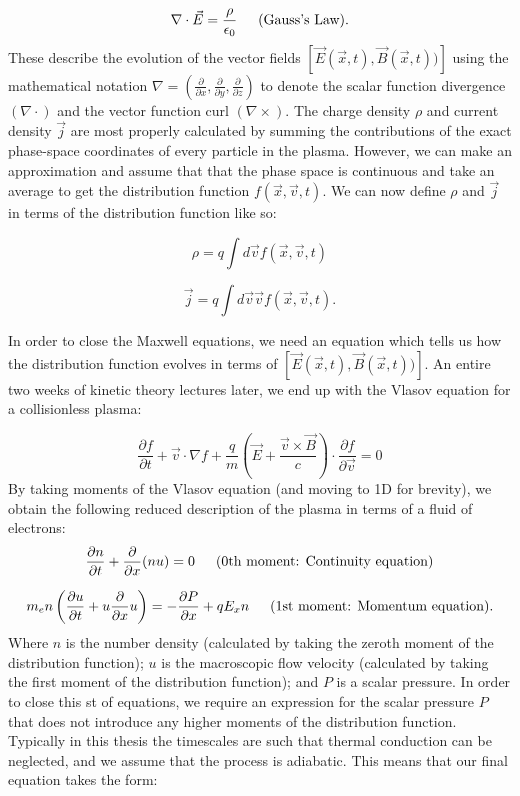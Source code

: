 \begin{equation}
\nabla \cdot \vec{E}=\frac{\rho}{\epsilon_{0}} \text{\,\,\,\,\,\,\,\,\,(Gauss's Law)}.
\end{equation} These describe the evolution of the vector fields $[\vec{E}(\vec{x},t),\vec{B}(\vec{x},t))]$ using the mathematical notation $\nabla = \left(\frac{\partial}{\partial x},\frac{\partial}{\partial y},\frac{\partial}{\partial z} \right)$ to denote the scalar function divergence $(\nabla \cdot)$ and the vector function curl $(\nabla \times)$. The charge density $\rho$ and current density $\vec{j}$ are most properly calculated by summing the contributions of the exact phase-space coordinates of every particle in the plasma. However, we can make an approximation and assume that that the phase space is continuous and take an average to get the distribution function $f(\vec{x},\vec{v},t)$. We can now define $\rho$ and $\vec{j}$ in terms of the distribution function like so:

\begin{equation}
\rho= q \int d \vec{v} f(\vec{x},\vec{v},t)
\end{equation}

\begin{equation}
\vec{j} = q \int d \vec{v} \vec{v} f(\vec{x},\vec{v},t).
\end{equation}

In order to close the Maxwell equations, we need an equation which tells us how the distribution function evolves in terms of $[\vec{E}(\vec{x},t),\vec{B}(\vec{x},t))]$. An entire two weeks of kinetic theory lectures later, we end up with the Vlasov equation for a collisionless plasma:

\begin{equation}
 	\frac{\partial f}{\partial t}+\vec{v} \cdot {\nabla} f+\frac{q}{m}\left(\vec{E}+\frac{\vec{v} \times \vec{B}}{c}\right) \cdot \frac{\partial f}{\partial \vec{v}}=0
\end{equation} By taking moments of the Vlasov equation (and moving to 1D for brevity), we obtain the following reduced description of the plasma in terms of a fluid of electrons: 
\begin{equation}
\frac{\partial n}{\partial t}+\frac{\partial}{\partial x}(n u)=0 \text{\,\,\,\,\,\,\,\,\,(0th moment: Continuity equation)}
\end{equation}

\begin{equation}
m_e n \left(\frac{\partial u}{\partial t} + u\frac{\partial}{\partial x}u\right)=-\frac{\partial P}{\partial x}+q E_{x} n \text{\,\,\,\,\,\,\,\,\,(1st moment: Momentum equation)}.
\end{equation} Where $n$ is the number density (calculated by taking the zeroth moment of the distribution function); $u$ is the macroscopic flow velocity (calculated by taking the first moment of the distribution function); and $P$ is a scalar pressure. In order to close this st of equations, we require an expression for the scalar pressure $P$ that does not introduce any higher moments of the distribution function. Typically in this thesis the timescales are such that thermal conduction can be neglected, and we assume that the process is adiabatic. This means that our final equation takes the form:

